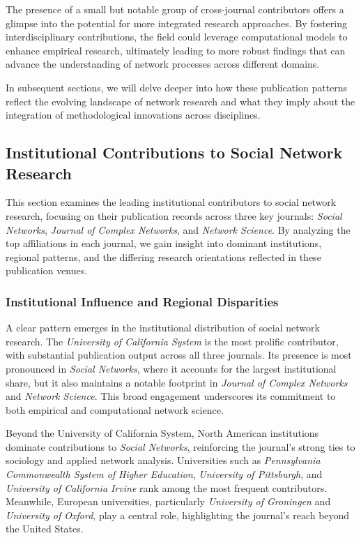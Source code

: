 \documentclass[twocolumn]{article}
\begin{document}
	The presence of a small but notable group of cross-journal contributors offers a glimpse into the potential for more integrated research approaches. By fostering interdisciplinary contributions, the field could leverage computational models to enhance empirical research, ultimately leading to more robust findings that can advance the understanding of network processes across different domains.
	
	In subsequent sections, we will delve deeper into how these publication patterns reflect the evolving landscape of network research and what they imply about the integration of methodological innovations across disciplines.
	
	\subsection{Institutional Contributions to Social Network Research}\label{Institutional Contributions to Social Network Research}
	
	This section examines the leading institutional contributors to social network research, focusing on their publication records across three key journals: \textit{Social Networks}, \textit{Journal of Complex Networks}, and \textit{Network Science}. By analyzing the top affiliations in each journal, we gain insight into dominant institutions, regional patterns, and the differing research orientations reflected in these publication venues.
	
	\subsubsection*{Institutional Influence and Regional Disparities}
	
	A clear pattern emerges in the institutional distribution of social network research. The \textit{University of California System} is the most prolific contributor, with substantial publication output across all three journals. Its presence is most pronounced in \textit{Social Networks}, where it accounts for the largest institutional share, but it also maintains a notable footprint in \textit{Journal of Complex Networks} and \textit{Network Science}. This broad engagement underscores its commitment to both empirical and computational network science.
	
	Beyond the University of California System, North American institutions dominate contributions to \textit{Social Networks}, reinforcing the journal’s strong ties to sociology and applied network analysis. Universities such as \textit{Pennsylvania Commonwealth System of Higher Education}, \textit{University of Pittsburgh}, and \textit{University of California Irvine} rank among the most frequent contributors. Meanwhile, European universities, particularly \textit{University of Groningen} and \textit{University of Oxford}, play a central role, highlighting the journal’s reach beyond the United States.
	
\end{document}
